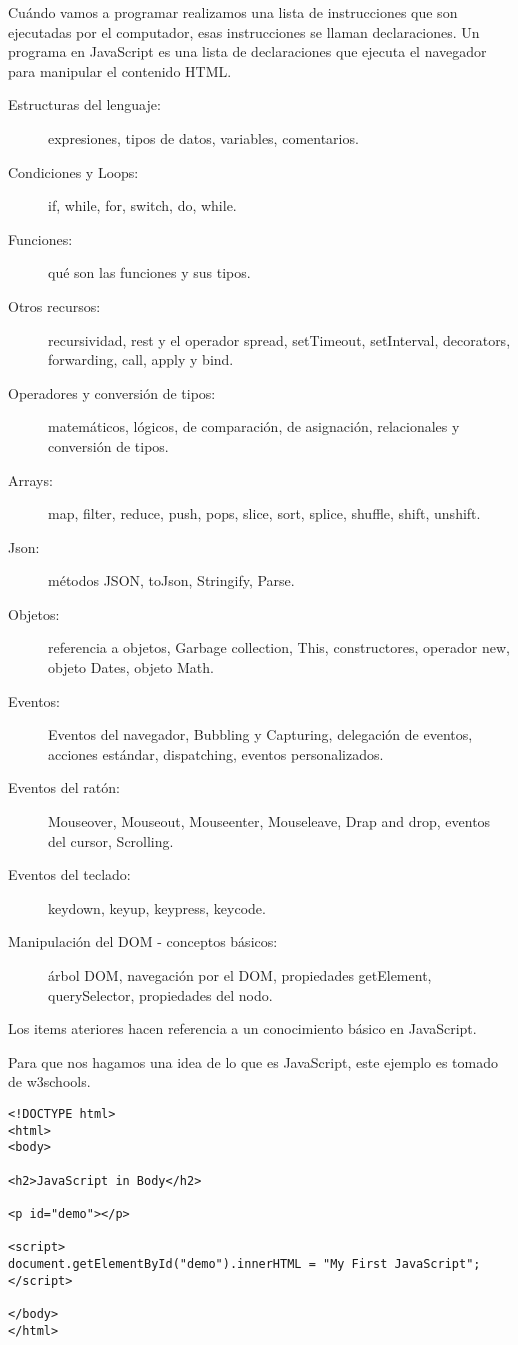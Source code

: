 Cu\'ando vamos a programar realizamos una lista de instrucciones que son ejecutadas por el computador, esas instrucciones se llaman declaraciones. Un programa en JavaScript es una lista de declaraciones que ejecuta el navegador para manipular el contenido HTML.

\begin{description}
    \item[Estructuras del lenguaje: ] expresiones, tipos de datos, variables, comentarios.
    \item[Condiciones y Loops: ] if, while, for, switch, do, while.
    \item[Funciones: ] qu\'e son las funciones y sus tipos.
    \item[Otros recursos: ]  recursividad, rest y el operador spread, setTimeout, setInterval, decorators, forwarding, call, apply y bind.
    \item[Operadores y conversi\'on de tipos: ] matem\'aticos, l\'ogicos, de comparaci\'on, de asignaci\'on, relacionales y conversi\'on de tipos.
    \item[Arrays: ] map, filter, reduce, push, pops, slice, sort, splice, shuffle, shift, unshift.
    \item[Json: ] m\'etodos JSON, toJson, Stringify, Parse.
    \item[Objetos: ] referencia a objetos, Garbage collection, This, constructores, operador new, objeto Dates, objeto Math.
    \item[Eventos: ] Eventos del navegador, Bubbling y Capturing, delegaci\'on de eventos, acciones est\'andar, dispatching, eventos personalizados.
    \item[Eventos del rat\'on: ] Mouseover, Mouseout, Mouseenter, Mouseleave, Drap and drop, eventos del cursor, Scrolling.
    \item[Eventos del teclado: ] keydown, keyup, keypress, keycode.
    \item[Manipulaci\'on del DOM - conceptos b\'asicos: ] \'arbol DOM, navegaci\'on por el DOM, propiedades getElement, querySelector, propiedades del nodo.
    \item[]
\end{description}
Los items ateriores hacen referencia a un conocimiento b\'asico en JavaScript.


Para que nos hagamos una idea de lo que es JavaScript, este ejemplo es tomado de w3schools.
\begin{verbatim}
<!DOCTYPE html>
<html>
<body>

<h2>JavaScript in Body</h2>

<p id="demo"></p>

<script>
document.getElementById("demo").innerHTML = "My First JavaScript";
</script>

</body>
</html> 
\end{verbatim}


